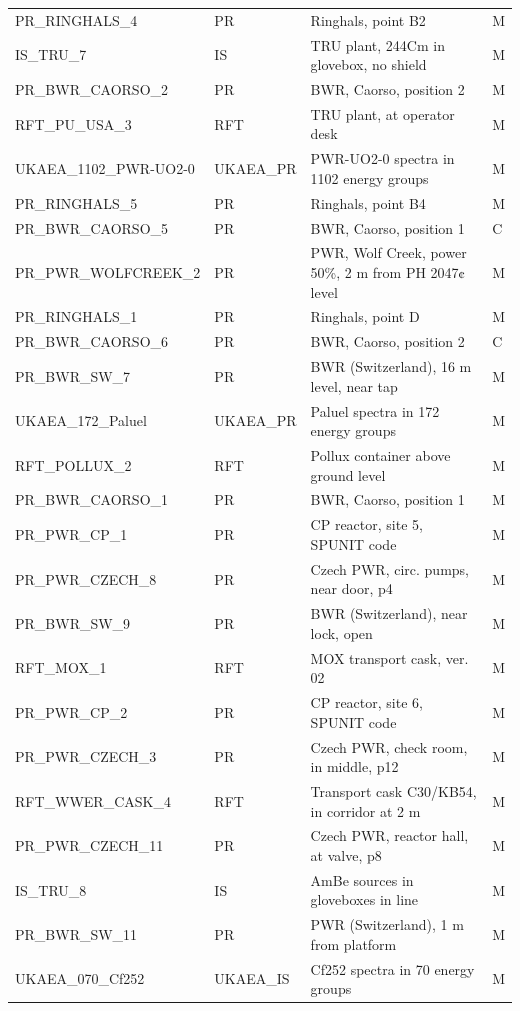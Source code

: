 \documentclass[a4paper, 12pt]{article}
\begin{document}
\begin{appendices}
\begin{longtable}{llll}
PR\_RINGHALS\_4 & PR & Ringhals, point B2  & M\\
IS\_TRU\_7 & IS & TRU plant, 244Cm in glovebox, no shield  & M\\
PR\_BWR\_CAORSO\_2 & PR & BWR, Caorso, position 2  & M\\
RFT\_PU\_USA\_3 & RFT & TRU plant, at operator desk  & M\\
UKAEA\_1102\_PWR-UO2-0 & UKAEA\_PR & PWR-UO2-0 spectra in 1102 energy groups & M\\
PR\_RINGHALS\_5 & PR & Ringhals, point B4  & M\\
PR\_BWR\_CAORSO\_5 & PR & BWR, Caorso, position 1  & C\\
PR\_PWR\_WOLFCREEK\_2 & PR & PWR, Wolf Creek, power 50\%, 2 m from PH 2047¢ level  & M\\
PR\_RINGHALS\_1 & PR & Ringhals, point D  & M\\
PR\_BWR\_CAORSO\_6 & PR & BWR, Caorso, position 2  & C\\
PR\_BWR\_SW\_7 & PR & BWR (Switzerland), 16 m level, near tap  & M\\
UKAEA\_172\_Paluel & UKAEA\_PR & Paluel spectra in 172 energy groups & M\\
RFT\_POLLUX\_2 & RFT & Pollux container above ground level  & M\\
PR\_BWR\_CAORSO\_1 & PR & BWR, Caorso, position 1  & M\\
PR\_PWR\_CP\_1 & PR & CP reactor, site 5, SPUNIT code  & M\\
PR\_PWR\_CZECH\_8 & PR & Czech PWR, circ. pumps, near door, p4  & M\\
PR\_BWR\_SW\_9 & PR & BWR (Switzerland), near lock, open  & M\\
RFT\_MOX\_1 & RFT & MOX transport cask, ver. 02  & M\\
PR\_PWR\_CP\_2 & PR & CP reactor, site 6, SPUNIT code  & M\\
PR\_PWR\_CZECH\_3 & PR & Czech PWR, check room, in middle, p12  & M\\
RFT\_WWER\_CASK\_4 & RFT & Transport cask C30/KB54, in corridor at 2 m  & M\\
PR\_PWR\_CZECH\_11 & PR & Czech PWR, reactor hall, at valve, p8  & M\\
IS\_TRU\_8 & IS & AmBe sources in gloveboxes in line  & M\\
PR\_BWR\_SW\_11 & PR & PWR (Switzerland), 1 m from platform  & M\\
UKAEA\_070\_Cf252 & UKAEA\_IS & Cf252 spectra in 70 energy groups & M\\

\end{longtable}
\end{appendices}
\end{document}
